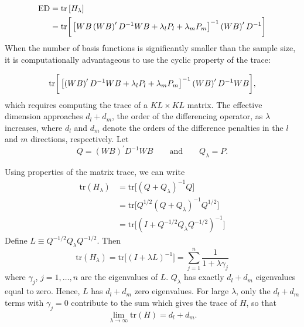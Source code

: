 \begin{align}
\begin{split} \label{eq:hat-matrix-trace}
\textup{ED} &= \textup{tr} \left[ H_\lambda \right]\\
&= \textup{tr}\bigg[\left[WB \left(WB\right)^\prime D^{-1}WB +  \lambda_l P_l+ \lambda_m P_m\right]^{-1} \left(W B\right)^\prime D^{-1}  \bigg]
\end{split}
\end{align}
\noindent
When the number of basis functions is significantly smaller than the sample size, it is computationally advantageous to use the cyclic property of the trace: 

\begin{equation*}
\textup{tr}\bigg[\left[ \left(WB\right)^\prime D^{-1}WB +  \lambda_l P_l+ \lambda_m P_m\right]^{-1} \left(W B\right)^\prime D^{-1} WB  \bigg],
\end{equation*}
\noindent
which requires computing the trace of a $KL \times KL$ matrix. The effective dimension approaches $d_l + d_m$, the order of the differencing operator, as $\lambda$ increases, where $d_l$ and $d_m$ denote the orders of the difference penalties in the $l$ and $m$ directions, respectively.  Let
\begin{equation*}
Q = \left(W B\right)^\prime D^{-1} WB \qquad \mbox{and} \qquad Q_\lambda = P.
\end{equation*}

Using properties of the matrix trace, we can write
\begin{align*}
\mbox{tr}\left(H_\lambda \right) &= \mbox{tr}\bigg[ \left(Q + Q_\lambda \right)^{-1}Q \bigg]\\
&=\mbox{tr}\bigg[ Q^{1/2}\left(Q + Q_\lambda \right)^{-1}Q^{1/2} \bigg] \\
&=\mbox{tr}\bigg[\left(I + Q^{-{1/2}}Q_\lambda Q^{-{1/2}} \right)^{-1} \bigg]
\end{align*}
Define $L \equiv Q^{-{1/2}}Q_\lambda Q^{-{1/2}}$. Then
\begin{equation*}
\mbox{tr}\left(H_\lambda \right) = \mbox{tr}\bigg[\left(I + \lambda L \right)^{-1} \bigg] = \sum_{j=1}^n \frac{1}{1 + \lambda \gamma_j}
\end{equation*}
 where $\gamma_j$, $j=1,\dots,n$ are the eigenvalues of $L$. $Q_\lambda$ has exactly $d_l + d_m$ eigenvalues equal to zero. Hence, $L$ has $d_l + d_m$ zero eigenvalues. For large $\lambda$, only the $d_l + d_m$ terms with $\gamma_j=0$ contribute to the sum which gives the trace of $H$, so that
 \[
\lim_{\lambda \rightarrow \infty  } \mbox{tr}\left(H\right) = d_l + d_m.
 \]

